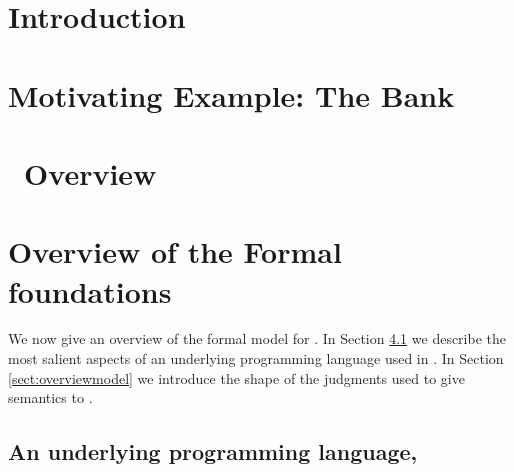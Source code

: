 \documentclass[acmsmall]{acmart}
\newcommand{\jm}[2][]{{#2}\xspace}
\begin{document}
\maketitle

\renewcommand{\shortauthors}{S. Drossopoulou, J. Noble, et al.}


\section{Introduction}
%


\section{Motivating Example: The Bank}
\label{sect:motivate:Bank}




\section{\Chainmail\ Overview}
\label{sect:chainmail}



\section{Overview of the Formal foundations}
\label{sect:formal}

\jm{We now give an overview of the formal model for \Chainmail.  In Section \ref{sect:PL} 
we describe the most salient aspects of an underlying programming language used in \Chainmail.
In Section \ref{sect:overviewmodel} we introduce  the shape of the judgments used to give semantics to \Chainmail.}

\subsection{An underlying programming language, \LangOO}
\label{sect:PL}

\end{document}
